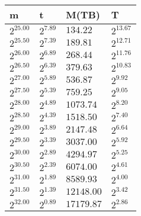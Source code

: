  \ 
\begin{tabular}{llll}
m & t & M(TB) & T \\ \hline
$2^{25.00}$ & $2^{7.89}$ & $134.22$ & $2^{13.67}$ \\
$2^{25.50}$ & $2^{7.39}$ & $189.81$ & $2^{12.71}$ \\
$2^{26.00}$ & $2^{6.89}$ & $268.44$ & $2^{11.76}$ \\
$2^{26.50}$ & $2^{6.39}$ & $379.63$ & $2^{10.83}$ \\
$2^{27.00}$ & $2^{5.89}$ & $536.87$ & $2^{9.92}$ \\
$2^{27.50}$ & $2^{5.39}$ & $759.25$ & $2^{9.05}$ \\
$2^{28.00}$ & $2^{4.89}$ & $1073.74$ & $2^{8.20}$ \\
$2^{28.50}$ & $2^{4.39}$ & $1518.50$ & $2^{7.40}$ \\
$2^{29.00}$ & $2^{3.89}$ & $2147.48$ & $2^{6.64}$ \\
$2^{29.50}$ & $2^{3.39}$ & $3037.00$ & $2^{5.92}$ \\
$2^{30.00}$ & $2^{2.89}$ & $4294.97$ & $2^{5.25}$ \\
$2^{30.50}$ & $2^{2.39}$ & $6074.00$ & $2^{4.61}$ \\
$2^{31.00}$ & $2^{1.89}$ & $8589.93$ & $2^{4.00}$ \\
$2^{31.50}$ & $2^{1.39}$ & $12148.00$ & $2^{3.42}$ \\
$2^{32.00}$ & $2^{0.89}$ & $17179.87$ & $2^{2.86}$ \\
\end{tabular}
 \ 

